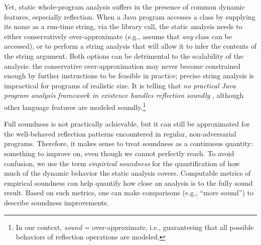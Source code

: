 Yet, static whole-program analysis suffers in the presence of common
dynamic features, especially reflection. When a Java program accesses
a class by supplying its name as a run-time string, via the
 library call, the static analysis
needs to either conservatively
over-approximate (e.g., assume that \emph{any} class can be accessed),
or to perform a string analysis that will allow it to infer the
contents of the  string argument. Both options can be
detrimental to the scalability of the analysis: the conservative
over-approximation may never become constrained enough by further
instructions to be feasible in practice; precise string analysis is
impractical for programs of realistic size.  It is telling that
\emph{no practical Java program analysis framework in existence
  handles reflection soundly} \cite{soundiness15}, although other
language features are modeled soundly.\footnote{In our context,
  \emph{sound} = over-approximate, i.e., guaranteeing that all
  possible behaviors of reflection operations are modeled.}

%
Full soundness is not practically achievable, but it can still be
approximated for the well-behaved reflection patterns encountered in
regular, non-adversarial programs.  Therefore, it makes sense to treat
soundness as a continuous quantity: something to improve on, even
though we cannot perfectly reach.  To avoid confusion, we use the term
\emph{empirical soundness} for the quantification of how much of the
dynamic behavior the static analysis covers. Computable metrics of
empirical soundness can help quantify how close an analysis is to the
fully sound result. Based on such metrics, one can make comparisons
(e.g., ``more sound'') to describe soundness improvements.





